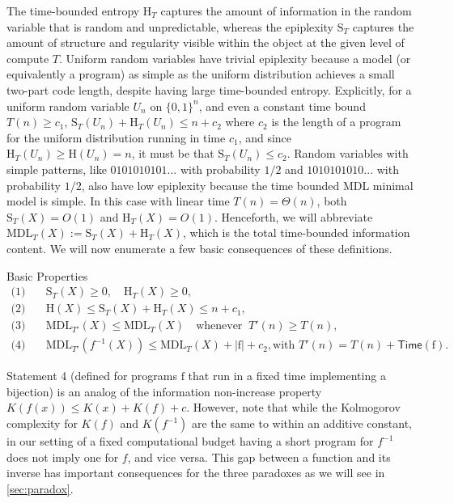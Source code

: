 \documentclass[twoside]{article}
\newcommand{\rH}{\mathrm{H}}
\newcommand{\rS}{\mathrm{S}}
\begin{document}
The time-bounded entropy $\mathrm{H}_T$ captures the amount of information in the random variable that is random and unpredictable, whereas the epiplexity $\mathrm{S}_T$ captures the amount of structure and regularity visible within the object at the given level of compute $T$. Uniform random variables have trivial epiplexity because a model (or equivalently a program) as simple as the uniform distribution achieves a small two-part code length, despite having large time-bounded entropy. Explicitly, for a uniform random variable $U_n$ on $\{0,1\}^n$, and even a constant time bound $T(n)\ge c_1$, $\rS_T(U_n)+\rH_T(U_n) \le n+c_2$ where $c_2$ is the length of a program for the uniform distribution running in time $c_1$, and since $\rH_T(U_n) \ge \rH(U_n)=n$, it must be that $\rS_T(U_n) \le c_2$.
Random variables with simple patterns, like $0101010101...$ with probability $1/2$ and $1010101010...$ with probability $1/2$, also have low epiplexity because the time bounded MDL minimal model is simple. In this case with linear time $T(n) = \Theta(n)$, both $\rS_T(X)= O(1)$ and $\rH_T(X) = O(1)$. Henceforth, we will abbreviate $\mathrm{MDL}_T(X):=\mathrm{S}_T(X)+\mathrm{H}_T(X)$, which is the total time-bounded information content. We will now enumerate a few basic consequences of these definitions.

\vspace{5mm}

\begin{remarkbox}{Basic Properties}\label{eq:basic}
\[
\begin{aligned}
\text{(1)}\quad 
  & \rS_T(X)\ge 0, \quad \rH_T(X) \ge 0,\\[0.4ex]
\text{(2)}\quad 
  & \rH(X)\le \rS_T(X)+\rH_T(X) \le n+c_1,\\[0.4ex]
\text{(3)}\quad 
  & \mathrm{MDL}_{T'}(X) \le \mathrm{MDL}_{T}(X)
    \quad \text{whenever } \ T'(n)\ge T(n),\\[0.4ex]
\text{(4)}\quad 
  & \mathrm{MDL}_{T'}(f^{-1}(X))
    \le \mathrm{MDL}_T(X) + |\mathrm{f}|+c_2,
  \text{with } T'(n)=T(n)+\mathsf{Time}(\mathrm f).
\end{aligned}
\]
\normalsize
\end{remarkbox}
\vspace{5mm}
%
Statement 4 (defined for programs $\mathrm{f}$ that run in a fixed time implementing a bijection) is an analog of the information non-increase property $K(f(x)) \le K(x)+K(f)+c$. However, note that while the Kolmogorov complexity for $K(f)$ and $K(f^{-1})$ are the same to within an additive constant, in our setting of a fixed computational budget having a short program for $f^{-1}$ does not imply one for $f$, and vice versa. This gap between a function and its inverse has important consequences for the three paradoxes as we will see in \autoref{sec:paradox}. %
\end{document}
